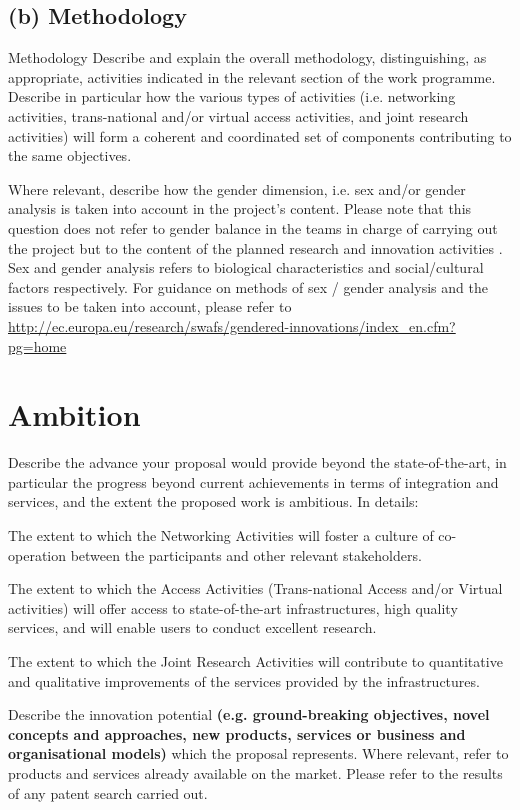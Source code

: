 

\subsection*{(b) Methodology}

\begin{todo}{Methodology}\color{red}
  Describe and explain the overall methodology, distinguishing, as appropriate, activities indicated in the relevant section of the work programme. Describe in particular how the various types of activities (i.e. networking activities, trans-national and/or virtual access activities, and joint research activities) will form a coherent and coordinated set of components contributing to the same objectives.

  Where relevant, describe how the gender dimension, i.e. sex and/or gender analysis is taken into account in the project’s content.
  Please note that this question does not refer to gender balance in the teams in charge of carrying out the project but to the content of the planned research and innovation activities . Sex and gender analysis refers to biological characteristics and social/cultural factors respectively. For guidance on methods of sex / gender analysis and the issues to be taken into account, please refer to \url{http://ec.europa.eu/research/swafs/gendered-innovations/index_en.cfm?pg=home} 
\end{todo}



\section{Ambition}

\begin{todo}{}\color{red}
  Describe the advance your proposal would provide beyond the state-of-the-art, in particular the progress beyond current achievements in terms of integration and services, and the extent the proposed work is ambitious. In details:

  The extent to which the Networking Activities will foster a culture of co-operation between the participants and other relevant stakeholders.

  The extent to which the Access Activities (Trans-national Access and/or Virtual activities) will offer access to state-of-the-art infrastructures, high quality services, and will enable users to conduct excellent research.

  The extent to which the Joint Research Activities will contribute to quantitative and qualitative improvements of the services provided by the infrastructures.

  Describe the innovation potential {\bf (e.g. ground-breaking objectives, novel concepts and approaches, new products, services or business and organisational models)} which the proposal represents. Where relevant, refer to products and services already available on the market. Please refer to the results of any patent search carried out.
\end{todo}









